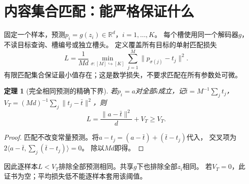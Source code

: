 \documentclass[UTF8,fontset=fandol,11pt,a4paper]{ctexart}
\newtheorem{theorem}{定理}[section]
\theoremstyle{remark}
\newcommand{\R}{\mathbb R}
\begin{document}
\section{内容集合匹配：能严格保证什么}
固定一个样本，预测$p_i=g(z_i)\in\R^d$，$i=1,\ldots,K$。
每个槽使用同一个解码器$g$，不读目标查询、槽编号或独立槽头。
定义覆盖所有目标的单射匹配损失
\begin{equation}\label{eq:set}
 L=\frac1{Md}\min_{\sigma:[M]\hookrightarrow[K]}
 \sum_{j=1}^M\|p_{\sigma(j)}-t_j\|^2 .
\end{equation}
有限匹配集合保证最小值存在；这是数学损失，不要求匹配在所有参数处可微。

\begin{theorem}[完全相同预测的精确下界]\label{th:constant}
若$p_i=a$对全部$i$成立，记$\bar t=M^{-1}\sum_jt_j$，
$V_T=(Md)^{-1}\sum_j\|t_j-\bar t\|^2$，则
\[
 L=\frac{\|a-\bar t\|^2}{d}+V_T\ge V_T.
\]
\end{theorem}
\begin{proof}
匹配不改变常量预测。将$a-t_j=(a-\bar t)+(\bar t-t_j)$代入，
交叉项为$2\langle a-\bar t,\sum_j(\bar t-t_j)\rangle=0$。
除以$Md$即得。
\end{proof}
因此逐样本$L<V_T$排除全部预测相同。共享$g$下也排除全部$z_i$相同。
若$V_T=0$，此证书为空；平均损失低不能逐样本套用该阈值。
\end{document}
